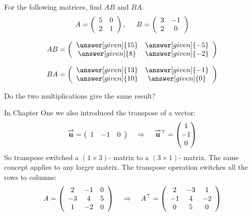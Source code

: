 \documentclass{ximera}
\begin{document}
\begin{question}
For the following matrices, find $AB$ and $BA$. 
\[
A= \left(\begin{array}{cc}
5 & 0 \\
2 & 1
\end{array}\right), \hspace{.5cm} B = \left(\begin{array}{cc}
3 & -1 \\
2 & 0
\end{array}\right)
\]
\begin{prompt}
\[
AB = \left(\begin{array}{cc}
\answer[given]{15} & \answer[given]{-5}\\
\answer[given]{8} & \answer[given]{-2}
\end{array}\right)\]

\[BA = \left(\begin{array}{cc}
\answer[given]{13} & \answer[given]{-1}\\
\answer[given]{10} & \answer[given]{0}
\end{array}\right)\]
\end{prompt}
Do the two multiplications give the same result? 
\end{question}
In Chapter One we also introduced the transpose of a vector:
\[
{\overset{\boldsymbol{\rightharpoonup}}{\mathbf{u}}}\hspace{0in} = \left(\begin{array}{ccc}
1 & -1 & 0
\end{array}\right)
\hspace{.4cm}\Rightarrow\hspace{.4cm}
{\overset{\boldsymbol{\rightharpoonup}}{\mathbf{u}}}\hspace{0in}^{\top} = \begin{pmatrix}
1\\
-1\\
0
\end{pmatrix}
\]
So transpose switched a $\left(1\times 3\right)$- matrix to a $\left(3\times 1\right)$- matrix. The same concept applies to any larger matrix. The transpose operation switches all the rows to columns: 
\[
A = \left(\begin{array}{ccc}
2 & -1 & 0\\
-3 & 4 & 5\\
1 & -2 & 0
\end{array}\right) 
\hspace{.4cm}\Rightarrow\hspace{.4cm}
A^{\top} = \left(\begin{array}{ccc}
2 & -3 & 1\\
-1 & 4 & -2\\
0& 5 & 0
\end{array}\right) 
\]
\end{document}
